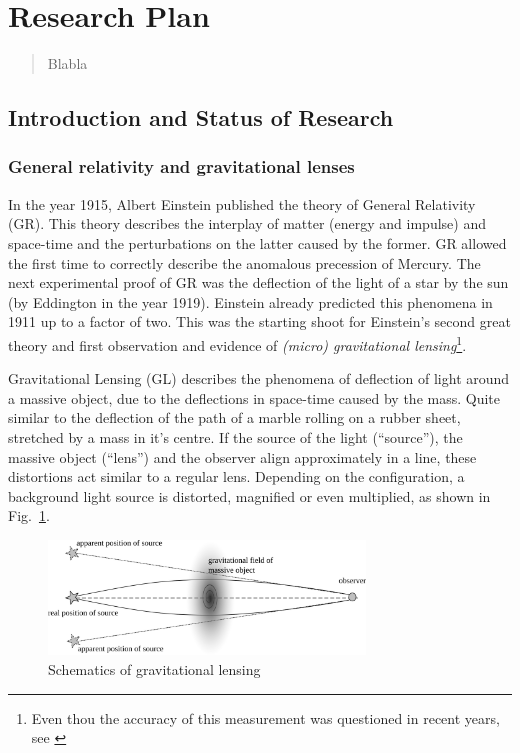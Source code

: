 \documentclass[11pt]{article}
\begin{document}
\newpage

\section*{Research Plan}

\begin{abstract}
Blabla
\end{abstract}


\subsection{Introduction and Status of Research}
\label{sec:intro}

\subsubsection{General relativity and gravitational lenses}

In the year 1915, Albert Einstein published the theory of General Relativity (GR).
This theory describes the interplay of matter (energy and impulse) and space-time and the perturbations on the latter caused by the former.
GR allowed the first time to correctly describe the anomalous precession of Mercury.
The next experimental proof of GR was the deflection of the light of a star by the sun (by Eddington in the year 1919).
Einstein already predicted this phenomena in 1911 up to a factor of two.
This was the starting shoot for Einstein’s second great theory and first observation and evidence of \emph{(micro) gravitational lensing}\footnote{Even thou the accuracy of this measurement was questioned in recent years, see \cite{kennefick2009testing}}.

Gravitational Lensing (GL) describes the phenomena of deflection of light around a massive object, due to the deflections in space-time caused by the mass.
Quite similar to the deflection of the path of a marble rolling on a rubber sheet, stretched by a mass in it's centre.
If the source of the light (``source''), the massive object (``lens'') and the observer align approximately in a line, these distortions act similar to a regular lens.
Depending on the configuration, a background light source is distorted, magnified or even multiplied, as shown in Fig.~\ref{fig:grav_lens}.

\begin{figure}[h]
	\centering
		\includegraphics[width=0.75\textwidth]{img/grav_lens}
	\caption{Schematics of gravitational lensing}
	\label{fig:grav_lens}
\end{figure}
\end{document}
